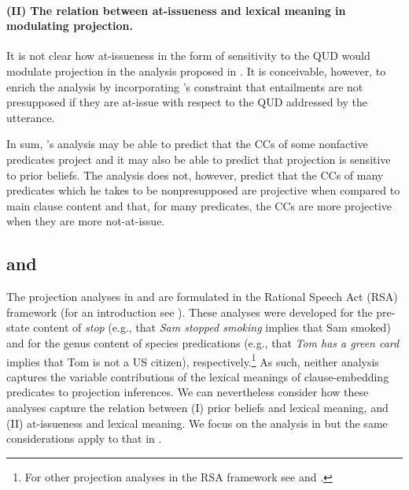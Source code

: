 \documentclass[11pt,fleqn]{article}
\newcommand{\6}{\mbox{$[\hspace*{-.6mm}[$}}
\newcommand{\9}{\mbox{$]\hspace*{-.6mm}]$}}
\newcommand{\citepos}[1]{\citeauthor{#1}'s \citeyear{#1}}
\begin{document}
\paragraph{(II) The relation between at-issueness and lexical meaning in modulating projection.} It is not clear how at-issueness in the form of sensitivity to the QUD would modulate projection in the analysis proposed in \citealt{schlenker2021}. It is conceivable, however, to enrich the analysis by incorporating \citepos{abrusan2011} constraint that entailments are not presupposed if they are at-issue with respect to the QUD addressed by the utterance.

\bigskip

In sum, \citepos{schlenker2021} analysis may be able to predict that the CCs of some nonfactive predicates project and it may also be able to predict that projection is sensitive to prior beliefs. The analysis does not, however, predict that the CCs of many predicates which he takes to be nonpresupposed are projective when compared to main clause content and that, for many predicates, the CCs are more projective when they are more not-at-issue.

\subsection{\citealt*{qing-etal2016} and \citealt{warstadt2022}}

The projection analyses in \citealt{qing-etal2016} and \citealt{warstadt2022} are formulated in the Rational Speech Act (RSA) framework (for an introduction see \citealt{degen2023-RSA}).  These analyses were developed for the pre-state content of {\em stop} (e.g., that {\em Sam stopped smoking} implies that Sam smoked) and for the genus content of species predications (e.g., that {\em Tom has a green card} implies that Tom is not a US citizen), respectively.\footnote{For other projection analyses in the RSA framework see \citealt{stevens-etal2017} and \citealt{pan-degen2023}.} As such, neither analysis captures the variable contributions of the lexical meanings of clause-embedding predicates to projection inferences. We can nevertheless consider how these analyses capture the relation between (I) prior beliefs and lexical meaning, and (II) at-issueness and lexical meaning. We focus on the analysis in \citealt{qing-etal2016} but the same considerations apply to that in \citealt{warstadt2022}.
\end{document}
